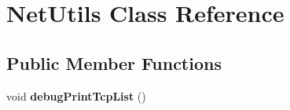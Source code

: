 \hypertarget{class_net_utils}{}\section{Net\+Utils Class Reference}
\label{class_net_utils}
\subsection*{Public Member Functions}
\begin{DoxyCompactItemize}
\item 
\hypertarget{class_net_utils_ab1f132b29ac270fc1a699cc21a4448b2}{}void {\bfseries debug\+Print\+Tcp\+List} ()\label{class_net_utils_ab1f132b29ac270fc1a699cc21a4448b2}

\end{DoxyCompactItemize}
